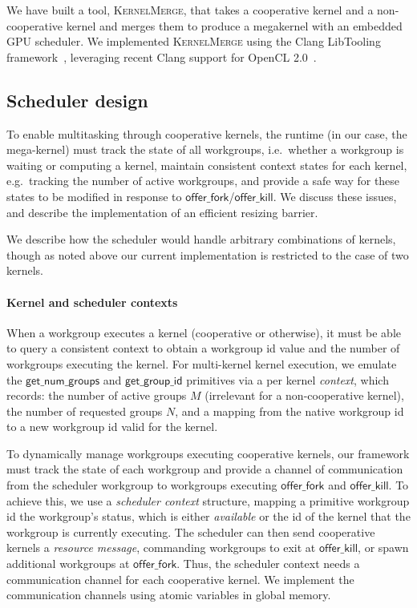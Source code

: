 \documentclass[numbers,nocopyrightspace,10pt]{sigplanconf}
\newcommand{\kernelmerge}{\textsc{KernelMerge}}
\newcommand{\offerfork}{\mathsf{offer\_fork}}
\newcommand{\offerkill}{\mathsf{offer\_kill}}
\newcommand{\getgroupid}{\mathsf{get\_group\_id}}
\newcommand{\getnumgroups}{\mathsf{get\_num\_groups}}
\begin{document}
We have built a tool, \kernelmerge{}, that takes a cooperative kernel
and a non-cooperative kernel and merges them to produce a megakernel
with an embedded GPU scheduler.  We implemented \kernelmerge{} using the
Clang LibTooling framework~\cite{clang}, leveraging recent Clang support
for OpenCL 2.0~\cite{ClangOpenCL20}.

\subsection{Scheduler design}\label{sec:resizingbarrier}\label{sec:schedulerimpl}

To enable multitasking through cooperative kernels, the runtime (in
our case, the mega-kernel) must track the state of all
workgroups, i.e.\ whether a workgroup is waiting or computing a kernel,
maintain consistent context states for each kernel, e.g.\ tracking the number
of active workgroups, and provide a
safe way for these states to be modified in response to $\offerfork$/$\offerkill$. We discuss these issues,
and describe the implementation of an efficient resizing barrier.

We describe how the scheduler would handle arbitrary
combinations of kernels, though as noted above our current
implementation is restricted to the case of two kernels.

\paragraph{Kernel and scheduler contexts}

When a workgroup executes a kernel (cooperative or otherwise), it must
be able to query a consistent context to obtain a workgroup id value
and the
number of workgroups executing the kernel. For multi-kernel
kernel execution, we emulate the $\getnumgroups$ and $\getgroupid$ 
primitives via a per kernel \emph{context}, which records: the number of active groups $M$ (irrelevant for a non-cooperative kernel), the number of requested groups $N$, and a mapping from the native workgroup id to a new workgroup
id valid for the kernel.

To dynamically manage workgroups executing cooperative
kernels, our framework must track the state of each workgroup and
provide a channel of communication from the scheduler workgroup to
workgroups executing $\offerfork$ and $\offerkill$. To achieve this,
we use a \emph{scheduler context} structure, mapping a primitive workgroup id the workgroup's status, which is either \emph{available} or the id of the kernel that the workgroup is currently executing.  The scheduler can then send cooperative
kernels a \emph{resource message}, commanding workgroups to exit at $\offerkill$, or 
spawn additional workgroups at $\offerfork$. Thus, the
scheduler context needs a communication channel for each cooperative
kernel. We implement the communication channels using atomic variables in global memory.
\end{document}
